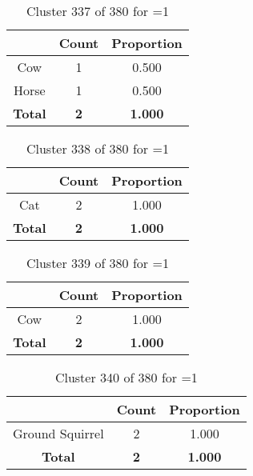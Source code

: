 \begin{table}[ht!]
\centering
\begin{tabular}{|c|c|c|}
\hline
\bf \Spec{} &\bf Count &\bf Proportion\\ \hline \hline
Cow & 1 & 0.500\\ \hline
Horse & 1 & 0.500\\ \hline
\hline
\bf Total & \bf 2 & \bf 1.000\\ \hline
\end{tabular}
\label{tab:cluster:337:1}
\caption{Cluster 337 of 380 for \minneigh{}=1}
\end{table}

\begin{table}[ht!]
\centering
\begin{tabular}{|c|c|c|}
\hline
\bf \Spec{} &\bf Count &\bf Proportion\\ \hline \hline
Cat & 2 & 1.000\\ \hline
\hline
\bf Total & \bf 2 & \bf 1.000\\ \hline
\end{tabular}
\label{tab:cluster:338:1}
\caption{Cluster 338 of 380 for \minneigh{}=1}
\end{table}

\begin{table}[ht!]
\centering
\begin{tabular}{|c|c|c|}
\hline
\bf \Spec{} &\bf Count &\bf Proportion\\ \hline \hline
Cow & 2 & 1.000\\ \hline
\hline
\bf Total & \bf 2 & \bf 1.000\\ \hline
\end{tabular}
\label{tab:cluster:339:1}
\caption{Cluster 339 of 380 for \minneigh{}=1}
\end{table}

\clearpage
\begin{table}[ht!]
\centering
\begin{tabular}{|c|c|c|}
\hline
\bf \Spec{} &\bf Count &\bf Proportion\\ \hline \hline
Ground Squirrel & 2 & 1.000\\ \hline
\hline
\bf Total & \bf 2 & \bf 1.000\\ \hline
\end{tabular}
\label{tab:cluster:340:1}
\caption{Cluster 340 of 380 for \minneigh{}=1}
\end{table}

